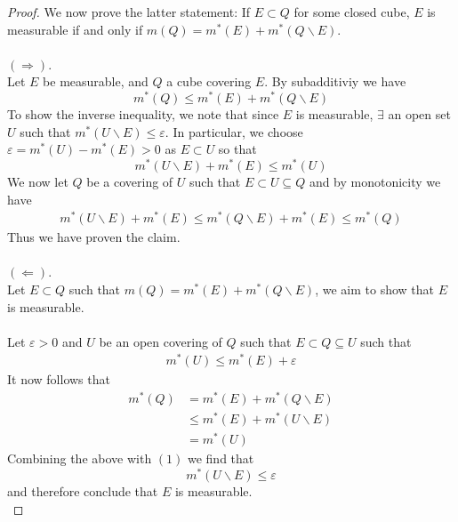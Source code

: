 \documentclass[nocolor]{report}
\begin{document}
\begin{proof}
    We now prove the latter statement: If $E\subset Q$ for some closed cube, $E$ is measurable if and only if $m(Q) = m^*(E) + m^*(Q\backslash E)$. \\
    \\
    $(\Rightarrow)$. \\
    Let $E$ be measurable, and $Q$ a cube covering $E$. By subadditiviy we have 
    $$m^*(Q) \leq m^*(E) + m^*(Q\backslash E)$$
    To show the inverse inequality, we note that since $E$ is measurable, $\exists$ an open set $U$ such that $m^*(U \backslash E) \leq \varepsilon$. In particular, we choose $\varepsilon = m^*(U) - m^*(E) > 0$ as $E\subset U$ so that 
    $$m^*(U\backslash E) + m^*(E) \leq m^*(U)$$
    We now let $Q$ be a covering of $U$ such that $E\subset U\subseteq Q$ and by monotonicity we have 
    \begin{align*}
        m^*(U\backslash E) + m^*(E) \leq m^*(Q \backslash E) +m^*(E) \leq m^*(Q)
    \end{align*}
    Thus we have proven the claim. \\
    \\
    $(\Leftarrow)$. \\
    Let $E\subset Q$ such that $m(Q) = m^*(E) + m^*(Q\backslash E)$, we aim to show that $E$ is measurable. \\
    \\
    Let $\varepsilon>0$ and $U$ be an open covering of $Q$ such that $E\subset Q\subseteq U$ such that 
    \begin{align*}
        m^*(U)\leq m^*(E) + \varepsilon
    \end{align*}
    It now follows that 
    \begin{align*}
        m^*(Q) &= m^*(E) + m^*(Q\backslash E) \\
               &\leq m^*(E) + m^*(U\backslash E) \\
               &= m^*(U) 
    \end{align*}
    Combining the above with $(1)$ we find that 
    $$m^*(U\backslash E) \leq \varepsilon$$
    and therefore conclude that $E$ is measurable. \\
\end{proof}
\end{document}
